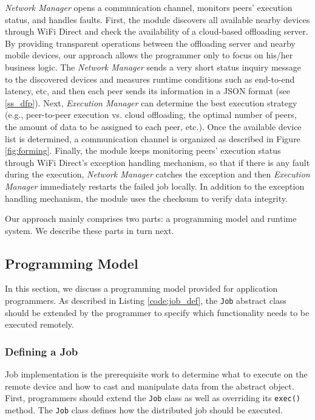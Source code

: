 \documentclass{sig-alternate}
\begin{document}
\emph{Network Manager} opens a communication channel, monitors peers' execution status, and handles faults. First, the module discovers all available nearby devices through WiFi Direct and check the availability of a cloud-based offloading server. By providing transparent operations between the offloading server and nearby mobile devices, our approach allows the programmer only to focus on his/her business logic. The \emph{Network Manager} sends a very short status inquiry message to the discovered devices and measures runtime conditions such as end-to-end latency, etc, and then each peer sends its information in a JSON format (see \ref{ss_dfp}). Next, \emph{Execution Manager} can determine the best execution strategy (e.g., peer-to-peer execution vs. cloud offloading, the optimal number of peers, the amount of data to be assigned to each peer, etc.). Once the available device list is determined, a communication channel is organized as described in Figure \ref{fig:forming}. Finally, the module keeps monitoring peers' execution status through WiFi Direct's exception handling mechanism, so that if there is any fault during the execution, \emph{Network Manager} catches the exception and then \emph{Execution Manager} immediately restarts the failed job locally. In addition to the exception handling mechanism, the module uses the checksum to verify data integrity.

Our approach mainly comprises two parts: a programming model and runtime system. We describe these parts in turn next.

\subsection{Programming Model} \label{prog_model}
In this section, we discuss a programming model provided for application programmers. As described in Listing \ref{code:job_def}, the \texttt{Job} abstract class should be extended by the programmer to specify which functionality needs to be executed remotely. 

\subsubsection{Defining a Job}
Job implementation is the prerequisite work to determine what to execute on the remote device and how to cast and manipulate data from the abstract object. First, programmers should extend the \texttt{Job} class as well as overriding its \texttt{exec()} method. The \texttt{Job} class defines how the distributed job should be executed. 
\end{document}
